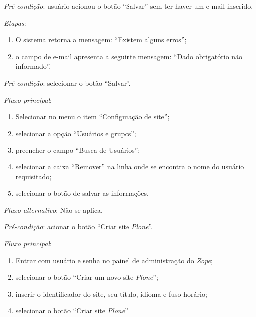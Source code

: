 \noindent \textit{Pré-condição}: usuário acionou o botão ``Salvar'' sem ter haver um e-mail inserido.

\noindent \textit{Etapas}:

\begin{enumerate}
    \item O sistema retorna a mensagem: ``Existem alguns erros'';
    \item o campo de e-mail apresenta a seguinte mensagem: ``Dado obrigatório não informado''.
\end{enumerate}



\vspace{0.7cm}

\noindent \textit{Pré-condição}: selecionar o botão ``Salvar''.

\noindent \textit{Fluxo principal}:

\begin{enumerate}
    \item Selecionar no menu o item ``Configuração de site'';
    \item selecionar a opção ``Usuários e grupos'';
    \item preencher o campo ``Busca de Usuários'';
    \item selecionar a caixa ``Remover'' na linha onde se encontra o nome do usuário requisitado;
    \item selecionar o botão de salvar as informações.
\end{enumerate}

\noindent \textit{Fluxo alternativo}: Não se aplica.



\vspace{0.7cm}

\noindent \textit{Pré-condição}: acionar o botão ``Criar site \textit{Plone}''.

\noindent \textit{Fluxo principal}:

\begin{enumerate}
    \item Entrar com usuário e senha no painel de administração do \textit{Zope};
    \item selecionar o botão ``Criar um novo site \textit{Plone}'';
    \item inserir o identificador do site, seu título, idioma e fuso horário;
    \item selecionar o botão ``Criar site \textit{Plone}''.
\end{enumerate}

